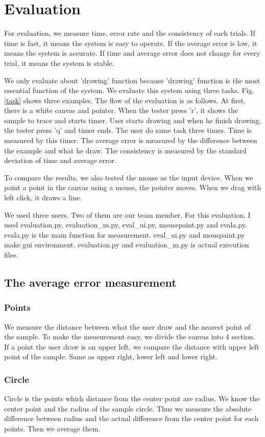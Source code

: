 \clearpage
\section{Evaluation}
For evaluation, we measure time, error rate and the consistency of each trials.
If time is fast, it means the system is easy to operate.
If the average error is low, it means the system is accurate.
If time and average error does not change for every trial, it means the system is stable.
\par
We only evaluate about 'drawing' function because 'drawing' function is the most essential function of the system.
We evaluate this system using three tasks. Fig. \ref{task} shows three examples.
The flow of the evaluation is as follows. At first, there is a white canvas and pointer.
When the tester press 'r', it shows the sample to trace and starts timer.
User starts drawing and when he finish drawing, the tester press 'q' and timer ends.
The user do same task three times.
Time is measured by this timer. The average error is measured by the difference between the example and what he draw. The consistency is measured by the standard deviation of time and average error.
\par
To compare the results, we also tested the mouse as the input device. When we point a point in the canvas using a mouse, the pointer moves. When we drag with left click, it draws a line.\par
We used three users. Two of them are our team member.
For this evaluation, I used evaluation.py, evaluation\_m.py, eval\_ui.py, mousepaint.py and evala.py.
evala.py is the main function for measurement. eval\_ui.py and mouspaint.py make gui environment. evaluation.py and evaluation\_m.py is actual execution files.
\subsection{The average error measurement}
\subsubsection{Points}
We measure the distance between what the user draw and the nearest point of the sample.
To make the measurement easy, we divide the canvas into 4 section.
If a point the user draw is on upper left, we compare the distance with upper left point of the sample. Same as upper right, lower left and lower right.
\subsubsection{Circle}
Circle is the points which distance from the center point are radius.
We know the center point and the radius of the sample circle.
Thus we measure the absolute difference between radius and the actual difference from the center point for each points. Then we average them.
